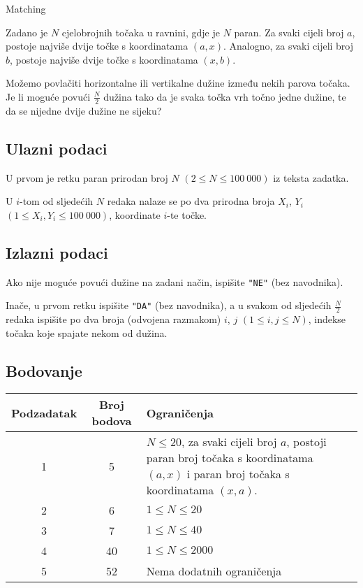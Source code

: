 \begin{statement}[
  problempoints=110,
  timelimit=1 sekunda,
  memorylimit=512 MiB,
]{Matching}

Zadano je $N$ cjelobrojnih točaka u ravnini, gdje je $N$ paran.  Za svaki
cijeli broj $a$, postoje najviše dvije točke s koordinatama $(a, x)$.
Analogno, za svaki cijeli broj $b$, postoje najviše dvije točke s
koordinatama $(x, b)$.

Možemo povlačiti horizontalne ili vertikalne dužine između nekih parova točaka.
Je li moguće povući $\frac{N}{2}$ dužina tako da je svaka točka vrh točno
jedne dužine, te da se nijedne dvije dužine ne sijeku?

\subsection*{Ulazni podaci}
U prvom je retku paran prirodan broj $N$ $(2 \le N \le 100\ 000)$ iz teksta
zadatka.

U $i$-tom od sljedećih $N$ redaka nalaze se po dva prirodna broja $X_i$, $Y_i$
$(1 \le X_i, Y_i \le 100\ 000)$, koordinate $i$-te točke.

\subsection*{Izlazni podaci}
Ako nije moguće povući dužine na zadani način, ispišite \texttt{"NE"} (bez
navodnika).

Inače, u prvom retku ispišite \texttt{"DA"} (bez navodnika), a u svakom od
sljedećih $\frac{N}{2}$ redaka ispišite po dva broja (odvojena razmakom) $i$,
$j$ $(1 \le i, j \le N)$, indekse točaka koje spajate nekom od dužina.

 \subsection*{Bodovanje}
{\renewcommand{\arraystretch}{1.4}
  \setlength{\tabcolsep}{6pt}
  \begin{tabular}{ccl}
 Podzadatak & Broj bodova & Ograničenja \\ \midrule
    1 & 5 &   \makecell[l]{$N \le 20$, za svaki cijeli broj $a$, postoji paran
              broj točaka s koordinatama $(a, x)$ \\ i paran broj točaka s koordinatama
              $(x, a)$. } \\
  2 & 6 & $1 \le N \le 20$ \\
  3 & 7 & $1 \le N \le 40$ \\
  4 & 40 & $1 \le N \le 2000$ \\
  5 & 52 & Nema dodatnih ograničenja
\end{tabular}}


\end{statement}
